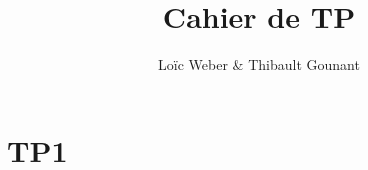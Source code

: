 \documentclass{article}
\author{Loïc Weber & Thibault Gounant}
\title{Cahier de TP}
\begin{document}
\setlength\parindent{0pt}

\maketitle

\section{TP1}
\end{document}
